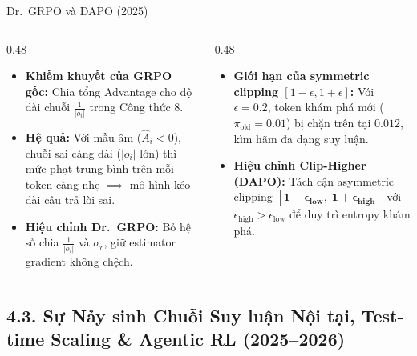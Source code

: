 \begin{frame}{Dr.\ GRPO và DAPO (2025)}
  \begin{columns}[T,onlytextwidth]
    \begin{column}{0.48\textwidth}
      \small
      \begin{itemize}\setlength{\itemsep}{4pt}
        \item \textbf{Khiếm khuyết của GRPO gốc:} Chia tổng Advantage cho độ dài chuỗi $\frac{1}{|o_i|}$ trong Công thức 8.
        \item \textbf{Hệ quả:} Với mẫu âm ($\hat{A}_i < 0$), chuỗi sai càng dài ($|o_i|$ lớn) thì mức phạt trung bình trên mỗi token càng nhẹ $\implies$ mô hình kéo dài câu trả lời sai.
        \item \textbf{Hiệu chỉnh Dr.\ GRPO:} Bỏ hệ số chia $\frac{1}{|o_i|}$ và $\sigma_r$, giữ estimator gradient không chệch.
      \end{itemize}
    \end{column}
    \begin{column}{0.48\textwidth}
      \small
      \begin{itemize}\setlength{\itemsep}{4pt}
        \item \textbf{Giới hạn của symmetric clipping $[1-\epsilon, 1+\epsilon]$:} Với $\epsilon = 0.2$, token khám phá mới ($\pi_{\text{old}} = 0.01$) bị chặn trên tại $0.012$, kìm hãm đa dạng suy luận.
        \item \textbf{Hiệu chỉnh Clip-Higher (DAPO):} Tách cận asymmetric clipping $\mathbf{[1 - \epsilon_{\text{low}}, \; 1 + \epsilon_{\text{high}}]}$ với $\epsilon_{\text{high}} > \epsilon_{\text{low}}$ để duy trì entropy khám phá.
      \end{itemize}
    \end{column}
  \end{columns}
  \par\vspace{0pt}
\end{frame}

\subsection{4.3. Sự Nảy sinh Chuỗi Suy luận Nội tại, Test-time Scaling \& Agentic RL (2025--2026)}

